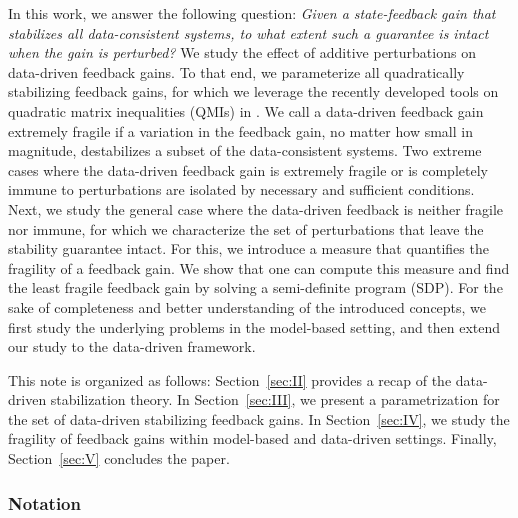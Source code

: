 \documentclass[9pt,shortpaper,twoside,web]{ieeecolor}
\begin{document}
In this work, we answer the following question: \emph{Given a state-feedback gain that stabilizes all data-consistent systems, to what extent such a guarantee is intact when the gain is perturbed?} We study the effect of additive perturbations on data-driven feedback gains. To that end, we parameterize all quadratically stabilizing feedback gains, for which we leverage the recently developed tools on quadratic matrix inequalities (QMIs) in \cite{HenkQMI2023,shakouri2024system}. We call a data-driven feedback gain extremely fragile if a variation in the feedback gain, no matter how small in magnitude, destabilizes a subset of the data-consistent systems. Two extreme cases where the data-driven feedback gain is extremely fragile or is completely immune to perturbations are isolated by necessary and sufficient conditions. Next, we study the general case where the data-driven feedback is neither fragile nor immune, for which we characterize the set of perturbations that leave the stability guarantee intact. For this, we introduce a measure that quantifies the fragility of a feedback gain. We show that one can compute this measure and find the least fragile feedback gain by solving a semi-definite program (SDP). For the sake of completeness and better understanding of the introduced concepts, we first study the underlying problems in the model-based setting, and then extend our study to the data-driven framework. 

This note is organized as follows: Section~\ref{sec:II} provides a recap of the data-driven stabilization theory. In Section~\ref{sec:III}, we present a parametrization for the set of data-driven stabilizing feedback gains. In Section~\ref{sec:IV}, we study the fragility of feedback gains within model-based and data-driven settings. Finally, Section~\ref{sec:V} concludes the paper. 

\subsubsection*{Notation}
\end{document}
